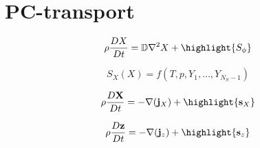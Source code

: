 \documentclass[20pt,twocolumn]{article}
\begin{document}

\vspace{10mm}

\setlength{\parindent}{0cm}

\renewcommand{\familydefault}{\sfdefault}

\LARGE

\section{PC-transport}

\begin{equation*}
\rho \frac{D X}{Dt} = \mathbb{D} \nabla^2 X + \highlight{S_{\phi}}
\end{equation*}

\begin{equation*}
S_{X}(X) = f(T, p, Y_1, \dots, Y_{N_S - 1})
\end{equation*}






\begin{equation*}
\rho \frac{D \mathbf{X}}{Dt} = - \nabla (\mathbf{j}_{X}) + \highlight{\mathbf{s}_{X}}
\end{equation*}

\begin{equation*}
\rho \frac{D \mathbf{z}}{Dt} = - \nabla (\mathbf{j}_{z}) + \highlight{\mathbf{s}_{z}}
\end{equation*}
\end{document}
